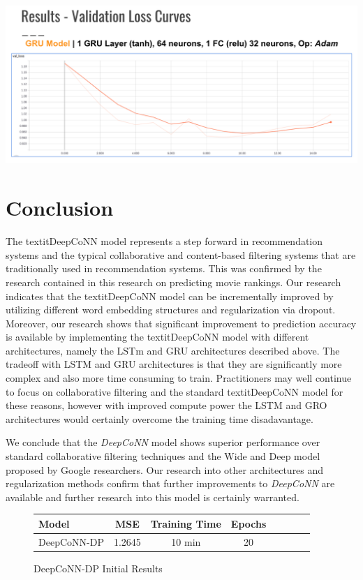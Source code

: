 \documentclass[10pt,twocolumn,letterpaper]{article}
\begin{document}
\includegraphics[scale=0.38]{Loss_Graph.png}

\section{Conclusion}

The textit{DeepCoNN} model represents a step forward in recommendation systems and the typical collaborative and content-based filtering systems that are traditionally used in recommendation systems. This was confirmed by the research contained in this research on predicting movie rankings. Our research indicates that the textit{DeepCoNN} model can be incrementally improved by utilizing different word embedding structures and regularization via dropout. Moreover, our research shows that significant improvement to prediction accuracy is available by implementing the textit{DeepCoNN} model with different architectures, namely the LSTm and GRU architectures described above. The tradeoff with LSTM and GRU architectures is that they are significantly more complex and also more time consuming to train. Practitioners may well continue to focus on collaborative filtering and the standard textit{DeepCoNN} model for these reasons, however with improved compute power the LSTM and GRO architectures would certainly overcome the training time disadavantage. 

We conclude that the \textit{DeepCoNN} model shows superior performance over standard collaborative filtering techniques and the Wide and Deep model proposed by Google researchers. Our research into other architectures and regularization methods confirm that further improvements to \textit{DeepCoNN} are available and further research into this model is certainly warranted. 






\begin{figure}[!ht]
\begin{center}
{\small
\begin{tabular}{l|ccccccc}
\hline
Model & MSE & Training Time & Epochs \\
\hline
DeepCoNN-DP & 1.2645 & 10 min & 20  \\
\hline
\end{tabular}
}
\end{center}
\caption{DeepCoNN-DP Initial Results}
\end{figure}
\end{document}
